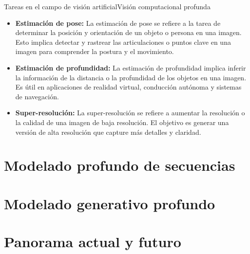 \documentclass[10pt,border=3pt,tikz]{beamer}
\begin{document}
    \begin{frame}{Tareas en el campo de visión artificial}{Visión computacional profunda}
        \begin{itemize}
            \item \textbf{Estimación de pose:} La estimación de pose se refiere a la tarea de determinar la posición y orientación de un objeto o persona en una imagen. Esto implica detectar y rastrear las articulaciones o puntos clave en una imagen para comprender la postura y el movimiento.
            \item \textbf{Estimación de profundidad:} La estimación de profundidad implica inferir la información de la distancia o la profundidad de los objetos en una imagen. Es útil en aplicaciones de realidad virtual, conducción autónoma y sistemas de navegación.
            \item \textbf{Super-resolución:} La super-resolución se refiere a aumentar la resolución o la calidad de una imagen de baja resolución. El objetivo es generar una versión de alta resolución que capture más detalles y claridad.
        \end{itemize}
    \end{frame}
    
    \section{Modelado profundo de secuencias}
    \section{Modelado generativo profundo}
    \section{Panorama actual y futuro}
    
\end{document}
